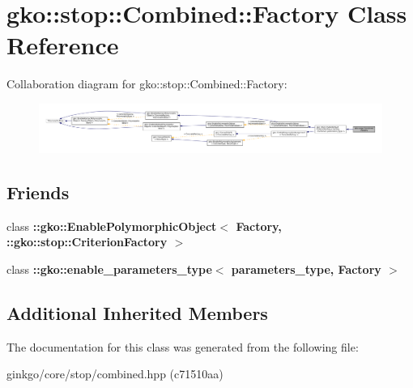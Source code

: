 \hypertarget{classgko_1_1stop_1_1Combined_1_1Factory}{}\section{gko\+:\+:stop\+:\+:Combined\+:\+:Factory Class Reference}
\label{classgko_1_1stop_1_1Combined_1_1Factory}


Collaboration diagram for gko\+:\+:stop\+:\+:Combined\+:\+:Factory\+:
\nopagebreak
\begin{figure}[H]
\begin{center}
\leavevmode
\includegraphics[width=350pt]{classgko_1_1stop_1_1Combined_1_1Factory__coll__graph}
\end{center}
\end{figure}
\subsection*{Friends}
\begin{DoxyCompactItemize}
\item 
\mbox{\label{classgko_1_1stop_1_1Combined_1_1Factory_aaa5507cf00e5361a77971746fefa42e6}} 
class {\bfseries \+::gko\+::\+Enable\+Polymorphic\+Object$<$ Factory, \+::gko\+::stop\+::\+Criterion\+Factory $>$}
\item 
\mbox{\label{classgko_1_1stop_1_1Combined_1_1Factory_a0d176cbd42d6214e11aee8c30ca256fc}} 
class {\bfseries \+::gko\+::enable\+\_\+parameters\+\_\+type$<$ parameters\+\_\+type, Factory $>$}
\end{DoxyCompactItemize}
\subsection*{Additional Inherited Members}


The documentation for this class was generated from the following file\+:\begin{DoxyCompactItemize}
\item 
ginkgo/core/stop/combined.\+hpp (c71510aa)\end{DoxyCompactItemize}
